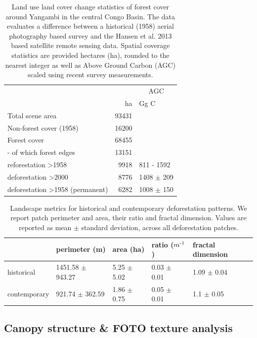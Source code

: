 \documentclass[remote sensing,article,submit,moreauthors,pdftex]{mdpi}
\begin{document}
\begin{table}[!h]

\caption{\label{tab:unnamed-chunk-10}Land use land cover change statistics of forest cover around Yangambi in the central Congo Basin. The data evaluates a difference between a historical (1958) aerial photography based survey and the Hansen et al. 2013 based satellite remote sensing data. Spatial coverage statistics are provided hectares (ha), rounded to the nearest integer as well as Above Ground Carbon (AGC) scaled using recent survey measurements.}
\centering
\begin{tabular}[t]{lrl}
\toprule
\multicolumn{2}{c}{ } & \multicolumn{1}{c}{AGC} \\
\cmidrule(l{3pt}r{3pt}){3-3}
  & ha & Gg C\\
\midrule
Total scene area & 93431 & \\
Non-forest cover (1958) & 16200 & \\
Forest cover & 68455 & \\
-  of which forest edges & 13151 & \\
reforestation >1958 & 9918 & 811 - 1592\\
\addlinespace
deforestation >2000 & 8776 & 1408 $\pm$ 209\\
deforestation >1958 (permanent) & 6282 & 1008 $\pm$ 150\\
\bottomrule
\end{tabular}
\end{table}

\begin{table}[!h]

\caption{\label{tab:unnamed-chunk-11}Landscape metrics for historical and contemporary deforestation patterns. We report patch perimeter and area, their ratio and fractal dimension. Values are reported as mean $\pm$ standard deviation, across all deforestation patches.}
\centering
\begin{tabular}[t]{lllll}
\toprule
  & perimeter (m) & area (ha) & ratio ($m\textsuperscript{-1}$) & fractal dimension\\
\midrule
historical & 1451.58 $\pm$ 943.27 & 5.25 $\pm$ 5.02 & 0.03 $\pm$ 0.01 & 1.09 $\pm$ 0.04\\
contemporary & 921.74 $\pm$ 362.59 & 1.86 $\pm$ 0.75 & 0.05 $\pm$ 0.01 & 1.1 $\pm$ 0.05\\
\bottomrule
\end{tabular}
\end{table}

\hypertarget{canopy-structure-foto-texture-analysis-1}{%
\subsection{Canopy structure \& FOTO texture
analysis}\label{canopy-structure-foto-texture-analysis-1}}
\end{document}
